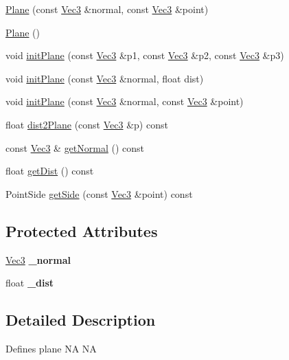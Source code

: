 \begin{DoxyCompactItemize}
\item 
\hyperlink{classPlane_ae7c0502b316e1b7b6cd3952681cf125d}{Plane} (const \hyperlink{classVec3}{Vec3} \&normal, const \hyperlink{classVec3}{Vec3} \&point)
\item 
\hyperlink{classPlane_acac0d9c003e0ab10d07b146c3566a0c7}{Plane} ()
\item 
void \hyperlink{classPlane_a8a0523f909ab6a99afd5a28126355856}{init\+Plane} (const \hyperlink{classVec3}{Vec3} \&p1, const \hyperlink{classVec3}{Vec3} \&p2, const \hyperlink{classVec3}{Vec3} \&p3)
\item 
void \hyperlink{classPlane_af071cae496399c411970511639c978ef}{init\+Plane} (const \hyperlink{classVec3}{Vec3} \&normal, float dist)
\item 
void \hyperlink{classPlane_a648afe6850294d33355f7c4625fffe4f}{init\+Plane} (const \hyperlink{classVec3}{Vec3} \&normal, const \hyperlink{classVec3}{Vec3} \&point)
\item 
float \hyperlink{classPlane_a7e5bcf2d7ae8efe45753d782944a618a}{dist2\+Plane} (const \hyperlink{classVec3}{Vec3} \&p) const
\item 
const \hyperlink{classVec3}{Vec3} \& \hyperlink{classPlane_af13c988be52f6382261ecd70987a24df}{get\+Normal} () const
\item 
float \hyperlink{classPlane_a7e8852aacb0d642999c6836d949d815f}{get\+Dist} () const
\item 
Point\+Side \hyperlink{classPlane_ac28f2e1e492b6267819ad3ad38d96c5a}{get\+Side} (const \hyperlink{classVec3}{Vec3} \&point) const
\end{DoxyCompactItemize}
\subsection*{Protected Attributes}
\begin{DoxyCompactItemize}
\item 
\mbox{\label{classPlane_a3a71b0381269601d4f7a30d1211edf7f}} 
\hyperlink{classVec3}{Vec3} {\bfseries \+\_\+normal}
\item 
\mbox{\label{classPlane_a158e00406234fc801a8d3ca3f2d889e4}} 
float {\bfseries \+\_\+dist}
\end{DoxyCompactItemize}


\subsection{Detailed Description}
Defines plane  NA  NA 

